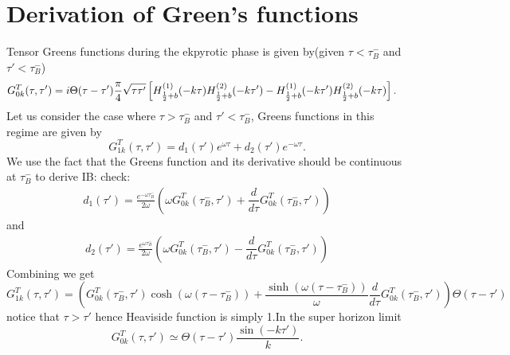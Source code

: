 \documentclass[12pt,a4paper]{article}
\newcommand{\IB}[1]{{\color{red}IB: #1}}
\numberwithin{equation}{section}
\numberwithin{equation}{section}
\begin{document}
\section{Derivation of Green's functions}
\label{app:greens}
Tensor Greens functions during the ekpyrotic phase is given by(given $\tau<\tau_B^- $ and $\tau'<\tau_B^- $)
    \begin{equation}
\begin{split}
    G^T_{0k}(\tau,\tau') &= i \Theta(\tau-\tau')  \frac{\pi}{4} \sqrt{\tau \tau'} %
    \left[H^{(1)}_{\frac{1}{2}+b}(-k\tau) H^{(2)}_{\frac{1}{2}+b}(-k\tau')-H^{(1)}_{\frac{1}{2}+b}(-k\tau')H^{(2)}_{\frac{1}{2}+b}(-k\tau)\right].\cr
    \end{split}
    \label{eq:geensfsten}
\end{equation}
Let us consider the case where $\tau>\tau_B^-$ and  $\tau'<\tau_B^-$, Greens functions in this regime are given by
\begin{equation}
    G^T_{1k}(\tau,\tau') = d_1(\tau') e^{\omega \tau} + d_2(\tau') e^{-\omega \tau}.
\end{equation}
We use the fact that the Greens function and its derivative should be continuous at $\tau_B^-$ to derive
\IB{check:}
\begin{equation}
    \begin{split}
        d_1(\tau') = \frac{e^{-\omega \tau_B^-}}{2\omega} \left( \omega  G^T_{0k}(\tau_B^-,\tau') +  \dfrac{d}{d\tau}   G^T_{0k}(\tau_B^-,\tau')  \right)
    \end{split}
\end{equation}
and 
\begin{equation}
    \begin{split}
        d_2(\tau') = \frac{e^{\omega \tau_B^-}}{2\omega} \left( \omega G^T_{0k}(\tau_B^-,\tau') -  \dfrac{d}{d\tau}   G^T_{0k}(\tau_B^-,\tau')  \right)
    \end{split}
\end{equation}
Combining we get
\begin{equation}
     G^T_{1k}(\tau,\tau') = \left( G^T_{0k}(\tau_B^-,\tau') \cosh(\omega(\tau-\tau_B^-))  + \frac{\sinh(\omega(\tau-\tau_B^-))}{\omega}  \dfrac{d}{d\tau}G^T_{0k}(\tau_B^-,\tau') \right)\Theta(\tau-\tau')
\end{equation}
notice that $\tau>\tau'$ hence Heaviside function is simply 1.In the super horizon limit
\begin{equation}
     G_{0k}^T(\tau,\tau') \simeq \Theta(\tau-\tau')   \frac{\sin(-k\tau')}{k} .
     \label{eq:greenfst}
\end{equation}
\end{document}
